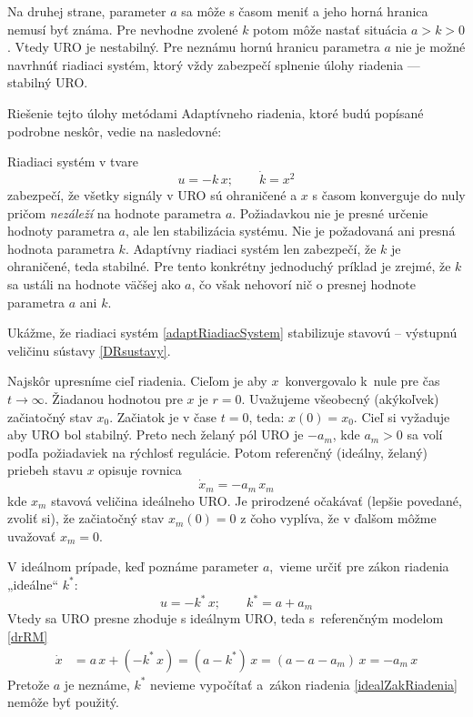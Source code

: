 \documentclass[a4paper, 10pt, ]{article}
\begin{document}
Na druhej strane, parameter $a$ sa môže s časom meniť a jeho horná hranica nemusí byť známa. Pre nevhodne zvolené $k$ potom môže nastať situácia $a>k>0$. Vtedy URO je nestabilný. Pre neznámu hornú hranicu parametra $a$ nie je možné navrhnúť riadiaci systém, ktorý vždy zabezpečí splnenie úlohy riadenia --- stabilný URO.

Riešenie tejto úlohy metódami Adaptívneho riadenia, ktoré budú popísané podrobne neskôr, vedie na nasledovné:

Riadiaci systém v tvare
\begin{equation} \label{adaptRiadiacSystem}
	u = -k\, x; \qquad \dot{k} = x^2
\end{equation}
zabezpečí, že všetky signály v URO sú ohraničené a $x$ s časom konverguje do nuly pričom \emph{nezáleží} na hodnote parametra $a$. Požiadavkou nie je presné určenie hodnoty parametra $a$, ale len stabilizácia systému. Nie je požadovaná ani presná hodnota parametra $k$. Adaptívny riadiaci systém len zabezpečí, že $k$ je ohraničené, teda stabilné. Pre tento konkrétny jednoduchý príklad je zrejmé, že $k$ sa ustáli na hodnote väčšej ako $a$, čo však nehovorí nič o presnej hodnote parametra $a$ ani $k$.

Ukážme, že riadiaci systém \eqref{adaptRiadiacSystem} stabilizuje stavovú -- výstupnú veličinu sústavy \eqref{DRsustavy}.

Najskôr upresníme cieľ riadenia. Cieľom je aby $x$~konvergovalo k~nule pre čas $t\rightarrow\infty$. Žiadanou hodnotou pre $x$ je $r=0$. Uvažujeme všeobecný (akýkoľvek) začiatočný stav $x_0$. Začiatok je v čase $t = 0$, teda: $x(0) = x_0$. Cieľ si vyžaduje aby URO bol stabilný. Preto nech želaný pól URO je $-a_m$, kde $a_m>0$ sa volí podľa požiadaviek na rýchlosť regulácie. Potom referenčný (ideálny, želaný) priebeh stavu $x$ opisuje rovnica
\begin{equation} \label{drRM}
	\dot{x}_m = -a_m\, x_m
\end{equation}
kde $x_m$ stavová veličina ideálneho URO. Je prirodzené očakávať (lepšie povedané, zvoliť si), že začiatočný stav $x_m(0) = 0$ z čoho vyplíva, že v ďalšom môžme uvažovať $x_m = 0$.

V ideálnom prípade, keď poznáme parameter $a$,~vieme určiť  pre zákon riadenia „ideálne“ $k^*$:
\begin{equation} \label{idealZakRiadenia}
	u = -k^* \, x; \qquad k^* = a + a_m
\end{equation}
Vtedy sa URO presne zhoduje s ideálnym URO, teda s~referenčným modelom \eqref{drRM}
\begin{equation}
	\begin{split}
		\dot{x} &= a\, x + \left( -k^* \, x \right) = \left(a - k^* \right)\,x = \left(a - a - a_m \right)\,x  =- a_m\,x
	\end{split}
\end{equation}
Pretože $a$ je neznáme, $k^*$ nevieme vypočítať a~zákon riadenia \eqref{idealZakRiadenia} nemôže byť použitý.
\end{document}
